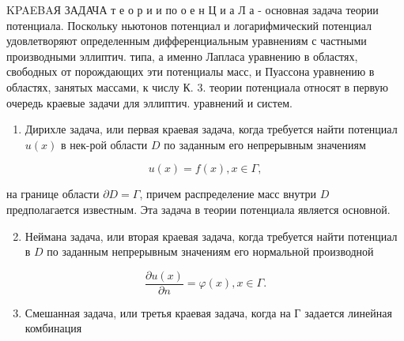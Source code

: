 \documentclass[10pt]{article}
\begin{document}
KPAEBAЯ ЗАДАЧА т е о р и и по о е н $Ц$ и а Л а - основная задача теории потенциала. Поскольку ньютонов потенциал и логарифмический потенциал удовлетворяют определенным дифференциальным уравнениям с частными производными эллиптич. типа, а именно Лапласа уравнению в областях, свободных от порождающих эти потенциалы масс, и Пуассона уравнению в областях, занятых массами, к числу К. 3. теории потенциала относят в первую очередь краевые задачи для эллиптич. уравнений и систем.



\begin{enumerate}

  \item Дирихле задача, или первая краевая задача, когда требуется найти потенциал $u(x)$ в нек-рой области $D$ по заданным его непрерывным значениям

\end{enumerate}



\[

u(x)=f(x), x \in \Gamma,

\]



на границе области $\partial D=\Gamma$, причем распределение масс внутри $D$ предполагается известным. Эта задача в теории потенциала является основной.



\begin{enumerate}

  \setcounter{enumi}{1}

  \item Неймана задача, или вторая краевая задача, когда требуется найти потенциал в $D$ по заданным непрерывным значениям его нормальной производной

\end{enumerate}



\[

\frac{\partial u(x)}{\partial n}=\varphi(x), x \in \Gamma .

\]



\begin{enumerate}

  \setcounter{enumi}{2}

  \item Смешанная задача, или третья краевая задача, когда на Г задается линейная комбинация

\end{enumerate}
\end{document}
